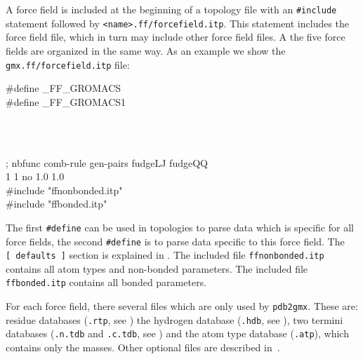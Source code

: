A force field is included at the beginning of a topology file with an
{\tt \#include} statement followed by {\tt <name>.ff/forcefield.itp}.
This statement includes the force field file,
which in turn may include other force field files. A the five force fields
are organized in the same way. As an example we show the {\tt gmx.ff/forcefield.itp}
file:

\begin{tt}
\#define \_FF\_GROMACS\\
\#define \_FF\_GROMACS1\\
\end{tt}\\
\begin{tt}
[ defaults ]\\
; nbfunc        comb-rule       gen-pairs       fudgeLJ fudgeQQ\\
  1             1               no              1.0     1.0\\

\#include "ffnonbonded.itp"\\
\#include "ffbonded.itp"\\
\end{tt}

The first {\tt \#define} can be used in topologies to parse data which is
specific for all {\gromacs} force fields, the second {\tt \#define} is to parse
data specific to this force field. The {\tt [~defaults~]} section is
explained in . The included file {\tt ffnonbonded.itp} contains
all atom types and non-bonded parameters. The included file {\tt ffbonded.itp}
contains all bonded parameters.

For each force field, there several files which are only used by {\tt pdb2gmx}.
These are: residue databases ({\tt .rtp}, see )
the hydrogen database ({\tt .hdb}, see ), two termini databases
({\tt .n.tdb} and {\tt .c.tdb}, see ) and
the atom type database ({\tt .atp}), which contains only the masses.  Other optional
files are described in~.


